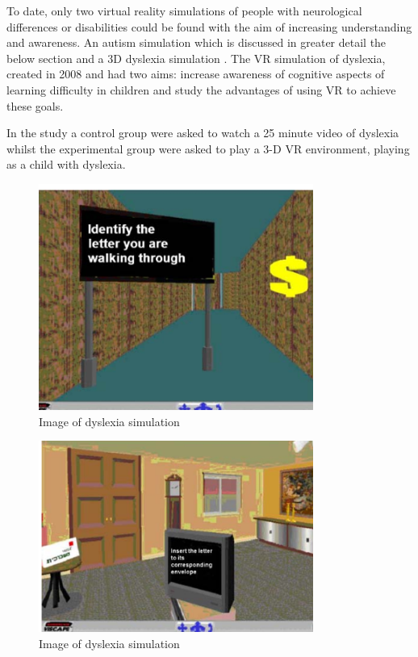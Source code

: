 \documentclass[11pt]{report}
\begin{document}
To date, only two virtual reality simulations of people with neurological differences or disabilities could be found with the aim of increasing understanding and awareness. An autism simulation which is discussed in greater detail the below section and a 3D dyslexia simulation \cite{dyslexicsimpar}. The VR simulation of dyslexia, created in 2008 and had two aims: increase awareness of cognitive aspects of learning difficulty in children and study the advantages of using VR to achieve these goals. 

In the study\cite{dyslexicsimpar} a control group were asked to watch a 25 minute video of dyslexia whilst the experimental group were asked to play a 3-D VR environment, playing as a child with dyslexia.

\begin{figure}[H]
\centering
\includegraphics[width=90mm]{images/litreview/dsim1.png}
\caption{Image of dyslexia simulation}
\label{autisim1}
\end{figure}

\begin{figure}[H]
\centering
\includegraphics[width=90mm]{images/litreview/dsim2.png}
\caption{Image of dyslexia simulation}
\label{autisim1}
\end{figure}
\end{document}

